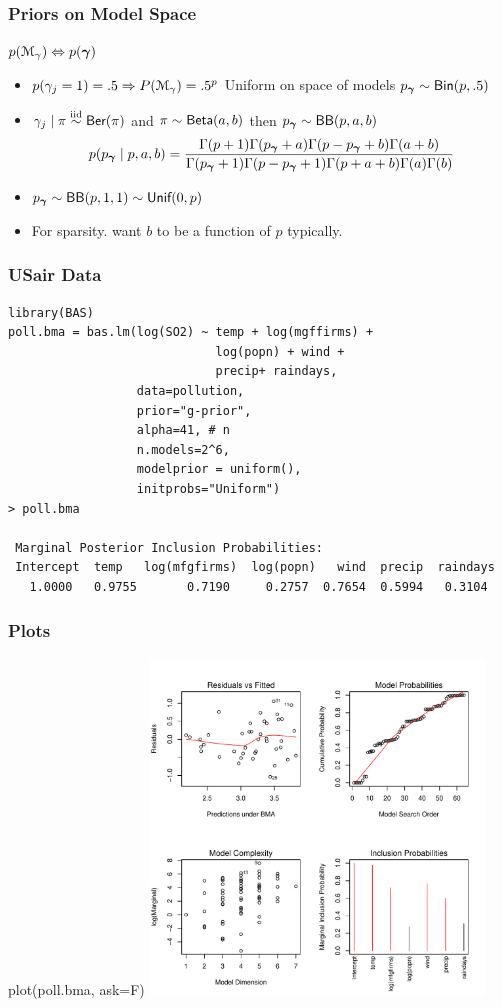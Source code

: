 \documentclass[]{beamer}
\begin{document}
\begin{frame}
  \frametitle{Priors on Model Space}
  $p({\cal M}_\gamma) \Leftrightarrow p(\boldsymbol{\gamma})$
  \begin{itemize}
  \item $p(\gamma_j = 1) = .5 \Rightarrow P({\cal M}_\gamma) = .5^p$  Uniform on space of models \pause $p_{\boldsymbol{\gamma}} \sim \textsf{Bin}(p, .5)$
\item $\gamma_j \mid \pi \mathrel{\mathop{\sim}\limits^{\rm iid}} \textsf{Ber}(\pi)$ and $\pi \sim \textsf{Beta}(a,b)$ then  $p_{\boldsymbol{\gamma}} \sim \textsf{BB}(p, a, b)$
$$
p(p_{\boldsymbol{\gamma}} \mid p, a, b) = \frac{ \Gamma(p + 1) \Gamma(p_{\boldsymbol{\gamma}} + a) \Gamma(p - p_{\boldsymbol{\gamma}} + b) \Gamma (a + b) }{\Gamma(p_{\boldsymbol{\gamma}}+1) \Gamma(p - p_{\boldsymbol{\gamma}} + 1) \Gamma(p + a + b) \Gamma(a) \Gamma(b)}
$$
\item $p_{\boldsymbol{\gamma}} \sim \textsf{BB}(p, 1, 1) \sim \textsf{Unif}(0, p)$
\item For sparsity. want $b$ to be a function of $p$ typically. 
  \end{itemize}
\end{frame}

\begin{frame}[fragile]
\frametitle{USair Data}
\begin{verbatim}
library(BAS)
poll.bma = bas.lm(log(SO2) ~ temp + log(mgffirms) + 
                             log(popn) + wind + 
                             precip+ raindays, 
                  data=pollution, 
                  prior="g-prior", 
                  alpha=41, # n
                  n.models=2^6, 
                  modelprior = uniform(),
                  initprobs="Uniform")
> poll.bma

 Marginal Posterior Inclusion Probabilities: 
 Intercept  temp   log(mfgfirms)  log(popn)   wind  precip  raindays
   1.0000   0.9755       0.7190     0.2757  0.7654  0.5994   0.3104  
\end{verbatim}
\end{frame}
\begin{frame}[fragile]\frametitle{Plots}
plot(poll.bma, ask=F)
  \centering 
  \includegraphics[height=3.5in]{poll-bma-sum}
\end{frame}
\end{document}

